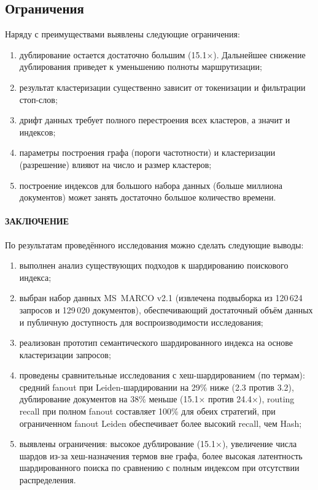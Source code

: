 \documentclass[14pt, a4paper]{article}
\newcommand{\structheader}[1]{%
	\phantomsection%
	\clearpage
	\paragraph*{{#1}}%
	\addcontentsline{toc}{section}{#1}%
}
\begin{document}
	\subsection{Ограничения}

	Наряду с преимуществами выявлены следующие ограничения:
	\begin{enumerate}
		\item дублирование остается достаточно большим (15.1×). Дальнейшее снижение дублирования приведет к уменьшению полноты маршрутизации;
		\item результат кластеризации существенно зависит от токенизации и фильтрации стоп-слов;
		\item дрифт данных требует полного перестроения всех кластеров, а значит и индексов;
		\item параметры построения графа (пороги частотности) и кластеризации (разрешение) влияют на число и размер кластеров;
		\item построение индексов для большого набора данных (больше миллиона документов) может занять достаточно большое количество времени.
	\end{enumerate}

	\structheader{ЗАКЛЮЧЕНИЕ}

	По результатам проведённого исследования можно сделать следующие выводы:
	\begin{enumerate}
		\item выполнен анализ существующих подходов к шардированию поискового индекса;
		\item выбран набор данных MS~MARCO v2.1 (извлечена подвыборка из 120\,624 запросов и 129\,020 документов), обеспечивающий достаточный объём данных и публичную доступность для воспроизводимости исследования;
		\item реализован прототип семантического шардированного индекса на основе кластеризации запросов;
		\item проведены сравнительные исследования с хеш-шардированием (по термам): средний fanout при Leiden-шардировании на 29\% ниже (2.3 против 3.2), дублирование документов на 38\% меньше (15.1× против 24.4×), routing recall при полном fanout составляет 100\% для обеих стратегий, при ограниченном fanout Leiden обеспечивает более высокий recall, чем Hash;
		\item выявлены ограничения: высокое дублирование (15.1×), увеличение числа шардов из-за хеш-назначения термов вне графа, более высокая латентность шардированного поиска по сравнению с полным индексом при отсутствии распределения.
	\end{enumerate}
\end{document}

